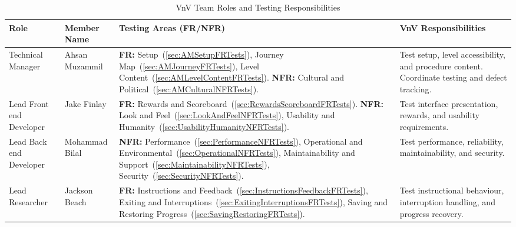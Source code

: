 \documentclass[10pt,titlepage]{article}
\begin{document}
\begin{table}[H]
\centering
\footnotesize
\setlength{\tabcolsep}{3pt}
\renewcommand{\arraystretch}{1.15}

\caption{VnV Team Roles and Testing Responsibilities}
\label{tab:VnVTeam}

\begin{tabularx}{\textwidth}{
    @{}
    >{\raggedright\arraybackslash}p{2.4cm}
    >{\raggedright\arraybackslash}p{2.3cm}
    >{\raggedright\arraybackslash}p{5.2cm}
    >{\raggedright\arraybackslash}X
    @{}
}
\toprule
\textbf{Role} &
\textbf{Member Name} &
\textbf{Testing Areas (FR/NFR)} &
\textbf{VnV Responsibilities} \\
\midrule

Technical Manager &
Ahsan Muzammil &
\textbf{FR:}
Setup~(\ref{sec:AMSetupFRTests}),
Journey Map~(\ref{sec:AMJourneyFRTests}),
Level Content~(\ref{sec:AMLevelContentFRTests}).
\newline
\textbf{NFR:}
Cultural and Political~(\ref{sec:AMCulturalNFRTests}). &
Test setup, level accessibility, and procedure content.
Coordinate testing and defect tracking. \\

\addlinespace[4pt]

Lead Front end
Developer &
Jake Finlay &
\textbf{FR:}
Rewards and Scoreboard~(\ref{sec:RewardsScoreboardFRTests}).
\newline
\textbf{NFR:}
Look and Feel~(\ref{sec:LookAndFeelNFRTests}),
Usability and Humanity~(\ref{sec:UsabilityHumanityNFRTests}). &
Test interface presentation, rewards,
and usability requirements. \\

\addlinespace[4pt]

Lead Back end
Developer &
Mohammad Bilal &
\textbf{NFR:}
Performance~(\ref{sec:PerformanceNFRTests}),
Operational and Environmental~(\ref{sec:OperationalNFRTests}),
Maintainability and Support~(\ref{sec:MaintainabilityNFRTests}),
Security~(\ref{sec:SecurityNFRTests}). &
Test performance, reliability,
maintainability, and security. \\

\addlinespace[4pt]

Lead Researcher &
Jackson Beach &
\textbf{FR:}
Instructions and Feedback~(\ref{sec:InstructionsFeedbackFRTests}),
Exiting and Interruptions~(\ref{sec:ExitingInterruptionsFRTests}),
Saving and Restoring Progress~(\ref{sec:SavingRestoringFRTests}). &
Test instructional behaviour,
interruption handling, and
progress recovery. \\


\end{tabularx}
\end{table}
\end{document}
